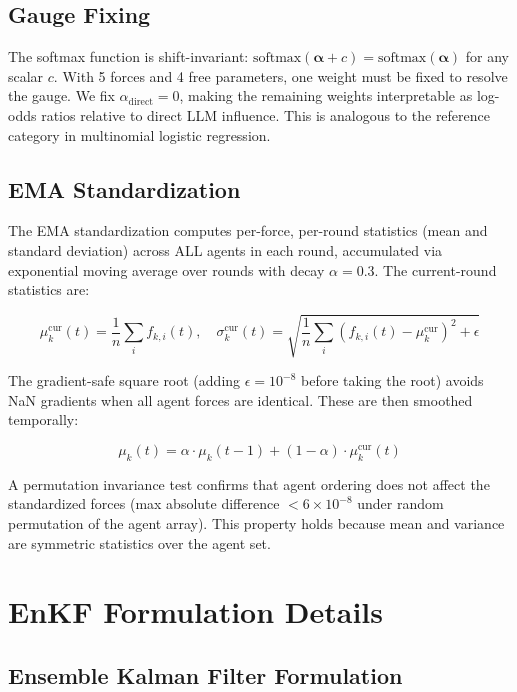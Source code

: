 \documentclass[12pt]{article}
\begin{document}
\subsection{Gauge Fixing}

The softmax function is shift-invariant: $\text{softmax}(\boldsymbol{\alpha} + c) = \text{softmax}(\boldsymbol{\alpha})$ for any scalar $c$. With 5 forces and 4 free parameters, one weight must be fixed to resolve the gauge. We fix $\alpha_{\text{direct}} = 0$, making the remaining weights interpretable as log-odds ratios relative to direct LLM influence. This is analogous to the reference category in multinomial logistic regression.

\subsection{EMA Standardization}

The EMA standardization computes per-force, per-round statistics (mean and standard deviation) across ALL agents in each round, accumulated via exponential moving average over rounds with decay $\alpha = 0.3$. The current-round statistics are:

\begin{equation}
\mu_k^{\text{cur}}(t) = \frac{1}{n}\sum_i f_{k,i}(t), \quad \sigma_k^{\text{cur}}(t) = \sqrt{\frac{1}{n}\sum_i (f_{k,i}(t) - \mu_k^{\text{cur}})^2 + \epsilon}
\end{equation}

The gradient-safe square root (adding $\epsilon = 10^{-8}$ before taking the root) avoids NaN gradients when all agent forces are identical. These are then smoothed temporally:

\begin{equation}
\mu_k(t) = \alpha \cdot \mu_k(t-1) + (1-\alpha) \cdot \mu_k^{\text{cur}}(t)
\end{equation}

A permutation invariance test confirms that agent ordering does not affect the standardized forces (max absolute difference $< 6 \times 10^{-8}$ under random permutation of the agent array). This property holds because mean and variance are symmetric statistics over the agent set.

\section{EnKF Formulation Details}
\label{app:enkf_details}

\subsection{Ensemble Kalman Filter Formulation}
\end{document}
